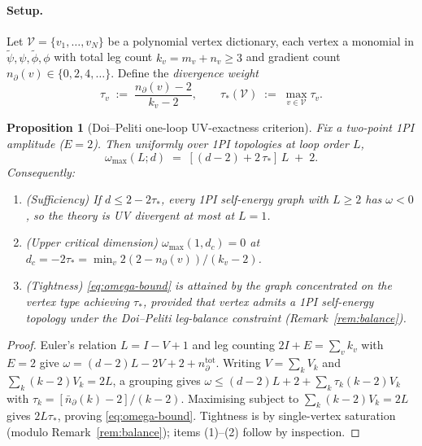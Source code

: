 \documentclass[11pt,a4paper]{article}
\newcommand{\psit}{\tilde\psi}
\newcommand{\phit}{\tilde\phi}
\theoremstyle{plain}
\newtheorem{proposition}[theorem]{Proposition}
\begin{document}
\paragraph{Setup.}
Let $\mathcal{V} = \{v_1,\ldots,v_N\}$ be a polynomial vertex
dictionary, each vertex a monomial in $\psit,\psi,\phit,\phi$
with total leg count $k_v = m_v + n_v \geq 3$ and gradient
count $n_\partial(v) \in \{0, 2, 4, \ldots\}$.  Define the
\emph{divergence weight}
\begin{equation}\label{eq:tau-def}
  \tau_v \;:=\; \frac{n_\partial(v) - 2}{k_v - 2},
  \qquad
  \tau_\ast(\mathcal{V}) \;:=\; \max_{v \in \mathcal{V}} \tau_v.
\end{equation}

\begin{proposition}[Doi--Peliti one-loop UV-exactness criterion]
\label{prop:one-loop-criterion}
Fix a two-point 1PI amplitude ($E = 2$).  Then uniformly over
1PI topologies at loop order $L$,
\begin{equation}\label{eq:omega-bound}
  \omega_{\max}(L;d) \;=\; [(d - 2) + 2\,\tau_\ast]\,L \;+\; 2.
\end{equation}
Consequently:
\begin{enumerate}[leftmargin=1.8em,itemsep=-0.2em]
\item \textup{(Sufficiency)} If $d \leq 2 - 2\tau_\ast$, every 1PI
      self-energy graph with $L \geq 2$ has $\omega < 0$, so the
      theory is UV divergent at most at $L = 1$.
\item \textup{(Upper critical dimension)} $\omega_{\max}(1,d_c) = 0$
      at $d_c = -2\tau_\ast = \min_v 2(2-n_\partial(v))/(k_v-2)$.
\item \textup{(Tightness)} \eqref{eq:omega-bound} is attained by
      the graph concentrated on the vertex type achieving
      $\tau_\ast$, provided that vertex admits a 1PI self-energy
      topology under the Doi--Peliti leg-balance constraint
      (Remark~\ref{rem:balance}).
\end{enumerate}
\end{proposition}

\begin{proof}
Euler's relation $L = I - V + 1$ and leg counting $2I + E = \sum_v k_v$
with $E = 2$ give $\omega = (d-2)L - 2V + 2 + n_\partial^{\mathrm{tot}}$.
Writing $V = \sum_k V_k$ and $\sum_k (k-2)V_k = 2L$, a grouping
gives
$\omega \leq (d-2)L + 2 + \sum_k \tau_k (k-2) V_k$
with $\tau_k = [\bar n_\partial(k)-2]/(k-2)$.  Maximising subject
to $\sum_k (k-2) V_k = 2L$ gives $2L\tau_\ast$, proving
\eqref{eq:omega-bound}.  Tightness is by single-vertex
saturation (modulo Remark~\ref{rem:balance}); items (1)--(2) follow
by inspection.
\end{proof}
\end{document}
